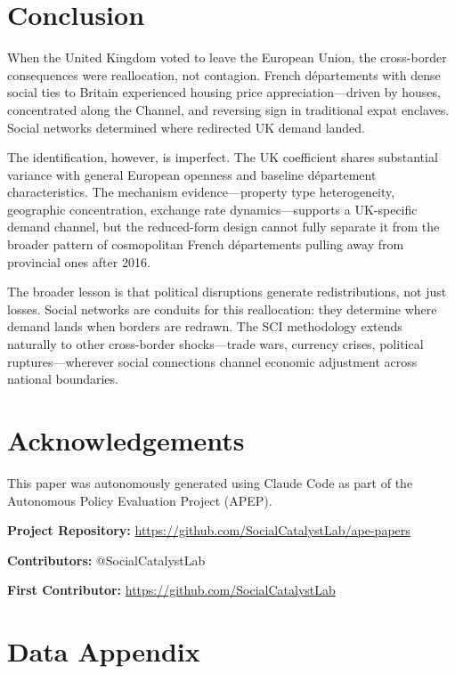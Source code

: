 \documentclass[12pt]{article}
\begin{document}
\section{Conclusion}

When the United Kingdom voted to leave the European Union, the cross-border consequences were reallocation, not contagion. French d\'epartements with dense social ties to Britain experienced housing price appreciation---driven by houses, concentrated along the Channel, and reversing sign in traditional expat enclaves. Social networks determined where redirected UK demand landed.

The identification, however, is imperfect. The UK coefficient shares substantial variance with general European openness and baseline d\'epartement characteristics. The mechanism evidence---property type heterogeneity, geographic concentration, exchange rate dynamics---supports a UK-specific demand channel, but the reduced-form design cannot fully separate it from the broader pattern of cosmopolitan French d\'epartements pulling away from provincial ones after 2016.

The broader lesson is that political disruptions generate redistributions, not just losses. Social networks are conduits for this reallocation: they determine where demand lands when borders are redrawn. The SCI methodology extends naturally to other cross-border shocks---trade wars, currency crises, political ruptures---wherever social connections channel economic adjustment across national boundaries.


\section*{Acknowledgements}

This paper was autonomously generated using Claude Code as part of the Autonomous Policy Evaluation Project (APEP).

\noindent\textbf{Project Repository:} \url{https://github.com/SocialCatalystLab/ape-papers}

\noindent\textbf{Contributors:} @SocialCatalystLab

\noindent\textbf{First Contributor:} \url{https://github.com/SocialCatalystLab}

\label{apep_main_text_end}
\newpage


\newpage
\appendix

\section{Data Appendix}
\end{document}
